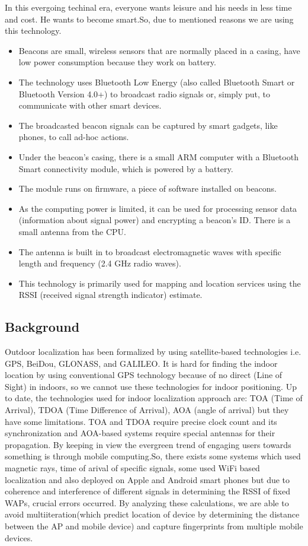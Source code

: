 In this evergoing techinal era, everyone wants leisure and his needs in less time and cost. He wants to become smart.So, due to mentioned reasons we are using this technology.
\begin{itemize}
\item Beacons are small, wireless sensors that are normally placed in a casing, have low power consumption because they work on battery.
\item The technology uses Bluetooth Low Energy (also called Bluetooth Smart or Bluetooth Version 4.0+) to broadcast radio signals or, simply put, to communicate with other smart devices.
\item The broadcasted beacon signals can be captured by smart gadgets, like phones, to call ad-hoc actions.
\item Under the beacon’s casing, there is a small ARM computer with a Bluetooth Smart connectivity module, which is powered by a battery.
\item The module runs on firmware, a piece of software installed on beacons.
\item As the computing power is limited, it can be used for processing sensor data (information about signal power) and encrypting a beacon’s ID. There is a small antenna from the CPU.
\item The antenna is built in to broadcast electromagnetic waves with specific length and frequency (2.4 GHz radio waves).
\item This technology is primarily used for mapping and location services using the RSSI (received signal strength indicator) estimate. 
\end{itemize}

\subsection{Background}
Outdoor localization has been formalized by using satellite-based technologies i.e. GPS\cite{GPS}, BeiDou\cite{cooper2016loco}, GLONASS\cite{cooper2016loco}, and GALILEO\cite{GALILEO}. It is hard for finding the indoor location by using conventional GPS technology because of no direct (Line of Sight)\cite{akram2018censloc} in indoors, so we cannot use these technologies for indoor positioning. Up to date, the technologies used for indoor localization approach are: TOA (Time of Arrival), TDOA (Time Difference of Arrival), AOA (angle of arrival) but they have some limitations. TOA and TDOA require precise clock count and its synchronization and AOA-based systems require special antennas for their propagation. 
By keeping in view the evergreen trend of engaging users towards something is through mobile computing.So, there exists some systems which used magnetic rays, time of arival of specific signals, some used WiFi based localization and also deployed on Apple and Android smart phones but due to coherence and interference of different signals in determining the RSSI of fixed WAPs, crucial errors occurred. By analyzing these calculations, we are able to avoid multiiteration(which predict location of device by determining the distance between the AP and mobile device) and capture fingerprints from multiple mobile devices.

